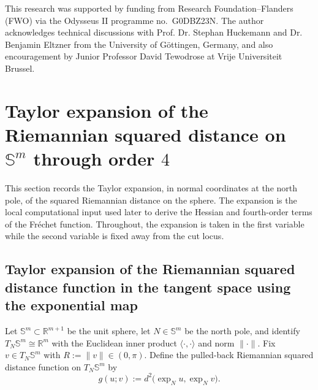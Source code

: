 \documentclass{amsart}
\theoremstyle{definition}
\theoremstyle{remark}
\newcommand\0{\boldsymbol{0}}
\begin{document}
This research was supported by funding from Research Foundation--Flanders (FWO) via the Odysseus II programme no.~G0DBZ23N. The author acknowledges technical discussions with Prof. Dr. Stephan Huckemann and Dr. Benjamin Eltzner from the University of G\"ottingen, Germany, and also encouragement by Junior Professor David Tewodrose at Vrije Universiteit Brussel.


\section{Taylor expansion of the Riemannian squared distance on $\mathbb{S}^m$ through order $4$}
\label{scn:TE-sqdist}

This section records the Taylor expansion, in normal coordinates at the north pole, of the squared Riemannian distance on the sphere.  The expansion is the local computational input used later to derive the Hessian and fourth-order terms of the Fr\'echet function.  Throughout, the expansion is taken in the first variable while the second variable is fixed away from the cut locus.

\subsection{Taylor expansion of the Riemannian squared distance function in the tangent space using the exponential map}

Let $\mathbb{S}^{m}\subset\mathbb{R}^{m+1}$ be the unit sphere, let $N\in\mathbb{S}^{m}$ be the north pole, and identify $T_{N}\mathbb{S}^{m}\cong\mathbb{R}^{m}$ with the Euclidean inner product $\langle\cdot,\cdot\rangle$ and norm $\|\cdot\|$.  Fix $v\in T_{N}\mathbb{S}^{m}$ with \(R:=\|v\|\in(0,\pi)\).  Define the pulled-back Riemannian squared distance function on \(T_N\mathbb S^m\) by
\begin{equation}\label{eqn:pulled-back-sq-dist}
   g(u;v):=d^{2}\big(\exp_{N}u,\exp_{N}v\big). 
\end{equation}
\end{document}
